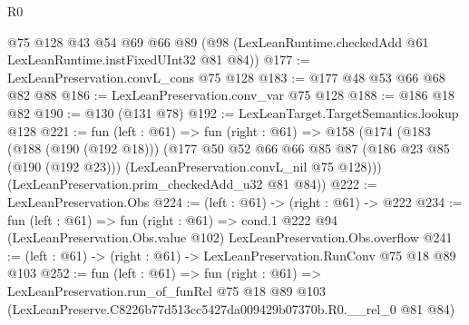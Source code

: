 \begin{lexlean}{R0}
\begin{coremodule}
    @75
    @128
    @43
    @54
    @69
    @66
    @89
    (@98 (LexLeanRuntime.checkedAdd @61 LexLeanRuntime.instFixedUInt32 @81 @84))
@177 := LexLeanPreservation.convL_cons @75 @128
@183 := @177 @48 @53 @66 @68 @82 @88
@186 := LexLeanPreservation.conv_var @75 @128
@188 := @186 @18 @82
@190 := @130 (@131 @78)
@192 := LexLeanTarget.TargetSemantics.lookup @128
@221 := fun (left : @61) =>
  fun (right : @61) =>
  @158
    (@174
      (@183
        (@188 (@190 (@192 @18)))
        (@177
          @50
          @52
          @66
          @66
          @85
          @87
          (@186 @23 @85 (@190 (@192 @23)))
          (LexLeanPreservation.convL_nil @75 @128)))
      (LexLeanPreservation.prim_checkedAdd_u32 @81 @84))
@222 := LexLeanPreservation.Obs
@224 := (left : @61) -> (right : @61) -> @222
@234 := fun (left : @61) =>
  fun (right : @61) =>
  cond.{1} @222 @94 (LexLeanPreservation.Obs.value @102) LexLeanPreservation.Obs.overflow
@241 := (left : @61) -> (right : @61) -> LexLeanPreservation.RunConv @75 @18 @89 @103
@252 := fun (left : @61) =>
  fun (right : @61) =>
  LexLeanPreservation.run_of_funRel
    @75
    @18
    @89
    @103
    (LexLeanPreserve.C8226b77d513cc5427da009429b07370b.R0.__rel_0 @81 @84)
\end{coremodule}
\end{lexlean}
